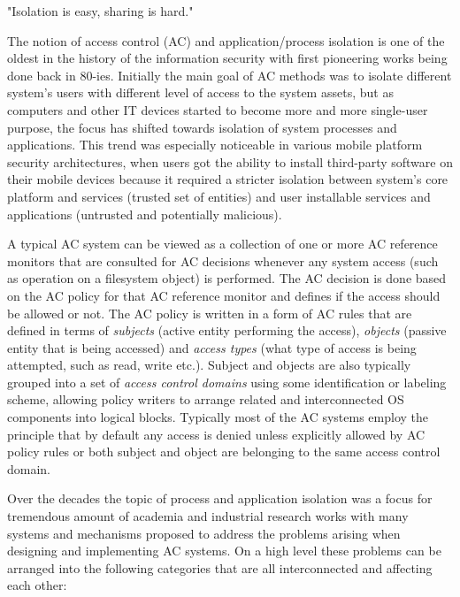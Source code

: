 \begin{quoting}
"Isolation is easy, sharing is hard."
\end{quoting}


The notion of access control (AC) and application/process isolation is one of the oldest in the history of the information security with first pioneering works being done back in 80-ies. Initially the main goal of AC methods was to isolate different system's users with different level of access to the system assets, but as computers and other IT devices started to become more and more single-user purpose, the focus has shifted towards isolation of system processes and applications. This trend was especially noticeable in various mobile platform security architectures, when users got the ability to install third-party software on their mobile devices because it required a stricter isolation between system's core platform and services (trusted set of entities) and user installable services and applications (untrusted and potentially malicious).

A typical AC system can be viewed as a collection of one or more AC reference monitors that are consulted for AC decisions whenever any system access (such as operation on a filesystem object) is performed. The AC decision is done based on the AC policy for that AC reference monitor and defines if the access should be allowed or not. The AC policy is written in a form of AC rules that are defined in terms of \textit{subjects} (active entity performing the access), \textit{objects} (passive entity that is being accessed) and \textit{access types} (what type of access is being attempted, such as read, write etc.). Subject and objects are also typically grouped into a set of \textit{access control domains} using some identification or labeling scheme, allowing policy writers to arrange related and interconnected OS components into logical blocks. Typically most of the AC systems employ the principle that by default any access is denied unless explicitly allowed by AC policy rules or both subject and object are belonging to the same access control domain.
 
Over the decades the topic of process and application isolation was a focus for tremendous amount of academia and industrial research works with many systems and mechanisms proposed to address the problems arising when designing and implementing AC systems. On a high level these problems can be arranged into the following categories that are all interconnected and affecting each other: 

